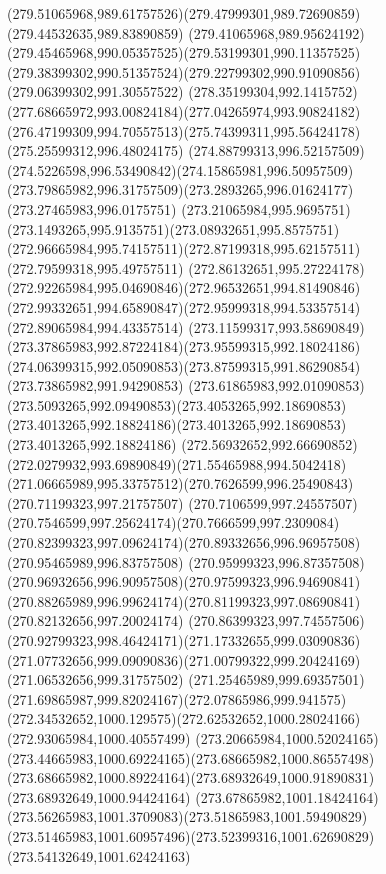 {{		\curveto(279.51065968,989.61757526)(279.47999301,989.72690859)(279.44532635,989.83890859)
		\curveto(279.41065968,989.95624192)(279.45465968,990.05357525)(279.53199301,990.11357525)
		\curveto(279.38399302,990.51357524)(279.22799302,990.91090856)(279.06399302,991.30557522)
		\curveto(278.35199304,992.1415752)(277.68665972,993.00824184)(277.04265974,993.90824182)
		\curveto(276.47199309,994.70557513)(275.74399311,995.56424178)(275.25599312,996.48024175)
		\curveto(274.88799313,996.52157509)(274.5226598,996.53490842)(274.15865981,996.50957509)
		\curveto(273.79865982,996.31757509)(273.2893265,996.01624177)(273.27465983,996.0175751)
		\curveto(273.21065984,995.9695751)(273.1493265,995.9135751)(273.08932651,995.8575751)
		\curveto(272.96665984,995.74157511)(272.87199318,995.62157511)(272.79599318,995.49757511)
		\curveto(272.86132651,995.27224178)(272.92265984,995.04690846)(272.96532651,994.81490846)
		\curveto(272.99332651,994.65890847)(272.95999318,994.53357514)(272.89065984,994.43357514)
		\curveto(273.11599317,993.58690849)(273.37865983,992.87224184)(273.95599315,992.18024186)
		\curveto(274.06399315,992.05090853)(273.87599315,991.86290854)(273.73865982,991.94290853)
		\curveto(273.61865983,992.01090853)(273.5093265,992.09490853)(273.4053265,992.18690853)
		\curveto(273.4013265,992.18824186)(273.4013265,992.18690853)(273.4013265,992.18824186)
		\curveto(272.56932652,992.66690852)(272.0279932,993.69890849)(271.55465988,994.5042418)
		\curveto(271.06665989,995.33757512)(270.7626599,996.25490843)(270.71199323,997.21757507)
		\curveto(270.7106599,997.24557507)(270.7546599,997.25624174)(270.7666599,997.2309084)
		\curveto(270.82399323,997.09624174)(270.89332656,996.96957508)(270.95465989,996.83757508)
		\curveto(270.95999323,996.87357508)(270.96932656,996.90957508)(270.97599323,996.94690841)
		\curveto(270.88265989,996.99624174)(270.81199323,997.08690841)(270.82132656,997.20024174)
		\curveto(270.86399323,997.74557506)(270.92799323,998.46424171)(271.17332655,999.03090836)
		\curveto(271.07732656,999.09090836)(271.00799322,999.20424169)(271.06532656,999.31757502)
		\curveto(271.25465989,999.69357501)(271.69865987,999.82024167)(272.07865986,999.941575)
		\curveto(272.34532652,1000.129575)(272.62532652,1000.28024166)(272.93065984,1000.40557499)
		\curveto(273.20665984,1000.52024165)(273.44665983,1000.69224165)(273.68665982,1000.86557498)
		\curveto(273.68665982,1000.89224164)(273.68932649,1000.91890831)(273.68932649,1000.94424164)
		\curveto(273.67865982,1001.18424164)(273.56265983,1001.3709083)(273.51865983,1001.59490829)
		\curveto(273.51465983,1001.60957496)(273.52399316,1001.62690829)(273.54132649,1001.62424163)
}}
